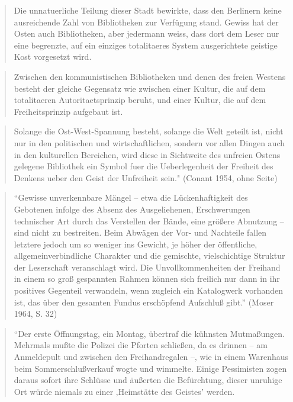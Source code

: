 \documentclass[a4paper,
fontsize=11pt,
oneside,
numbers=noperiodatend,
parskip=half-,
bibliography=totoc,
final
]{scrartcl}
\begin{document}
\begin{quote}
Die unnatuerliche Teilung dieser Stadt bewirkte, dass den Berlinern
keine ausreichende Zahl von Bibliotheken zur Verfügung stand. Gewiss hat
der Osten auch Bibliotheken, aber jedermann weiss, dass dort dem Leser
nur eine begrenzte, auf ein einziges totalitaeres System ausgerichtete
geistige Kost vorgesetzt wird.
\end{quote}

\begin{quote}
Zwischen den kommunistischen Bibliotheken und denen des freien Westens
besteht der gleiche Gegensatz wie zwischen einer Kultur, die auf dem
totalitaeren Autoritaetsprinzip beruht, und einer Kultur, die auf dem
Freiheitsprinzip aufgebaut ist.
\end{quote}

\begin{quote}
Solange die Ost-West-Spannung besteht, solange die Welt geteilt ist,
nicht nur in den politischen und wirtschaftlichen, sondern vor allen
Dingen auch in den kulturellen Bereichen, wird diese in Sichtweite des
unfreien Ostens gelegene Bibliothek ein Symbol fuer die Ueberlegenheit
der Freiheit des Denkens ueber den Geist der Unfreiheit sein." (Conant
1954, ohne Seite)
\end{quote}

\begin{quote}
\enquote{Gewisse unverkennbare Mängel -- etwa die Lückenhaftigkeit des
Gebotenen infolge des Absenz des Ausgeliehenen, Erschwerungen
technischer Art durch das Verstellen der Bände, eine größere Abnutzung
-- sind nicht zu bestreiten. Beim Abwägen der Vor- und Nachteile fallen
letztere jedoch um so weniger ins Gewicht, je höher der öffentliche,
allgemeinverbindliche Charakter und die gemischte, vielschichtige
Struktur der Leserschaft veranschlagt wird. Die Unvollkommenheiten der
Freihand in einem so groß gespannten Rahmen können sich freilich nur
dann in ihr positives Gegenteil verwandeln, wenn zugleich ein
Katalogwerk vorhanden ist, das über den gesamten Fundus erschöpfend
Aufschluß gibt.} (Moser 1964, S. 32)
\end{quote}

\begin{quote}
``Der erste Öffnungstag, ein Montag, übertraf die kühnsten Mutmaßungen.
Mehrmals mußte die Polizei die Pforten schließen, da es drinnen -- am
Anmeldepult und zwischen den Freihandregalen --‚ wie in einem Warenhaus
beim Sommerschlußverkauf wogte und wimmelte. Einige Pessimisten zogen
daraus sofort ihre Schlüsse und äußerten die Befürchtung, dieser
unruhige Ort würde niemals zu einer ‚Heimstätte des Geistes‛ werden.
\end{quote}
\end{document}
